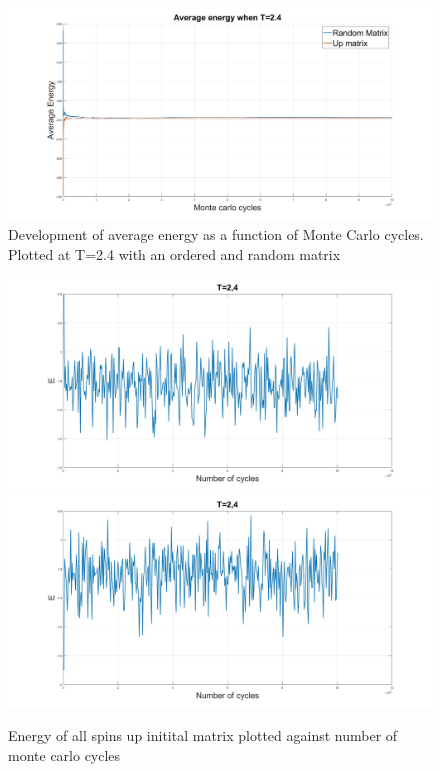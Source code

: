 \documentclass[10pt,a4paper]{article}
\begin{document}
\begin{figure} [H]
\centerline{
\includegraphics[scale=0.3]{avgEnergy24.jpg}
}
\caption{Development of average energy as a function of Monte Carlo cycles. Plotted at T=2.4 with an ordered and random matrix}
\label{fig:AverageEnergy24}
\end{figure}

\begin{figure} [H]
\centerline{
\includegraphics[scale=0.15]{RANDOMenergy24.jpg}
\includegraphics[scale=0.15]{UPenergy24.jpg}
}
\caption{Energy of all spins up initital matrix plotted against number of monte carlo cycles}
\label{fig:UpEnergy}
\end{figure}
\end{document}
